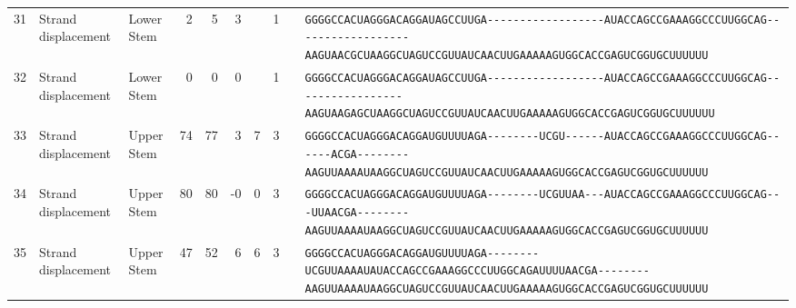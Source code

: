 \begin{tabular}{rllrrrrrcl}
 31 & Strand displacement & Lower Stem & 2 & 5 & 3 &  & 1 &  &
 \color{ucsfdarkgrey}\verb|GGGGCCACUAGGGACAGGAU|\color{ucsforange}\verb|AGCCUU|\color{ucsfblue}\verb|GA------------------|\color{ucsfpurple}\verb|AUACCAGCCGAAAGGCCCUUGGCAG|\color{ucsfblue}\verb|------------------AAGU|\color{ucsforange}\verb|AACGCUAA|\color{ucsfnavy}\verb|GGCUAGUCC|\color{ucsforange}\verb|GUUAUCA|\color{ucsfteal}\verb|ACUUGAAAAAGUG|\color{ucsforange}\verb|GCACCGAGUCGGUGCUUUUUU| \\

 32 & Strand displacement & Lower Stem & 0 & 0 & 0 &  & 1 &  &
 \color{ucsfdarkgrey}\verb|GGGGCCACUAGGGACAGGAU|\color{ucsforange}\verb|AGCCUU|\color{ucsfblue}\verb|GA------------------|\color{ucsfpurple}\verb|AUACCAGCCGAAAGGCCCUUGGCAG|\color{ucsfblue}\verb|-----------------AAGUA|\color{ucsforange}\verb|AGAGCUAA|\color{ucsfnavy}\verb|GGCUAGUCC|\color{ucsforange}\verb|GUUAUCA|\color{ucsfteal}\verb|ACUUGAAAAAGUG|\color{ucsforange}\verb|GCACCGAGUCGGUGCUUUUUU| \\

 33 & Strand displacement & Upper Stem & 74 & 77 & 3 & 7 & 3 &  &
 \color{ucsfdarkgrey}\verb|GGGGCCACUAGGGACAGGAU|\color{ucsforange}\verb|GUUUUA|\color{ucsfblue}\verb|GA--------UCGU------|\color{ucsfpurple}\verb|AUACCAGCCGAAAGGCCCUUGGCAG|\color{ucsfblue}\verb|------ACGA--------AAGU|\color{ucsforange}\verb|UAAAAUAA|\color{ucsfnavy}\verb|GGCUAGUCC|\color{ucsforange}\verb|GUUAUCA|\color{ucsfteal}\verb|ACUUGAAAAAGUG|\color{ucsforange}\verb|GCACCGAGUCGGUGCUUUUUU| \\

 34 & Strand displacement & Upper Stem & 80 & 80 & -0 & 0 & 3 &  &
 \color{ucsfdarkgrey}\verb|GGGGCCACUAGGGACAGGAU|\color{ucsforange}\verb|GUUUUA|\color{ucsfblue}\verb|GA--------UCGUUAA---|\color{ucsfpurple}\verb|AUACCAGCCGAAAGGCCCUUGGCAG|\color{ucsfblue}\verb|---UUAACGA--------AAGU|\color{ucsforange}\verb|UAAAAUAA|\color{ucsfnavy}\verb|GGCUAGUCC|\color{ucsforange}\verb|GUUAUCA|\color{ucsfteal}\verb|ACUUGAAAAAGUG|\color{ucsforange}\verb|GCACCGAGUCGGUGCUUUUUU| \\

 35 & Strand displacement & Upper Stem & 47 & 52 & 6 & 6 & 3 &  &
 \color{ucsfdarkgrey}\verb|GGGGCCACUAGGGACAGGAU|\color{ucsforange}\verb|GUUUUA|\color{ucsfblue}\verb|GA--------UCGUUAAAAU|\color{ucsfpurple}\verb|AUACCAGCCGAAAGGCCCUUGGCAG|\color{ucsfblue}\verb|AUUUUAACGA--------AAGU|\color{ucsforange}\verb|UAAAAUAA|\color{ucsfnavy}\verb|GGCUAGUCC|\color{ucsforange}\verb|GUUAUCA|\color{ucsfteal}\verb|ACUUGAAAAAGUG|\color{ucsforange}\verb|GCACCGAGUCGGUGCUUUUUU| \\


\end{tabular}
